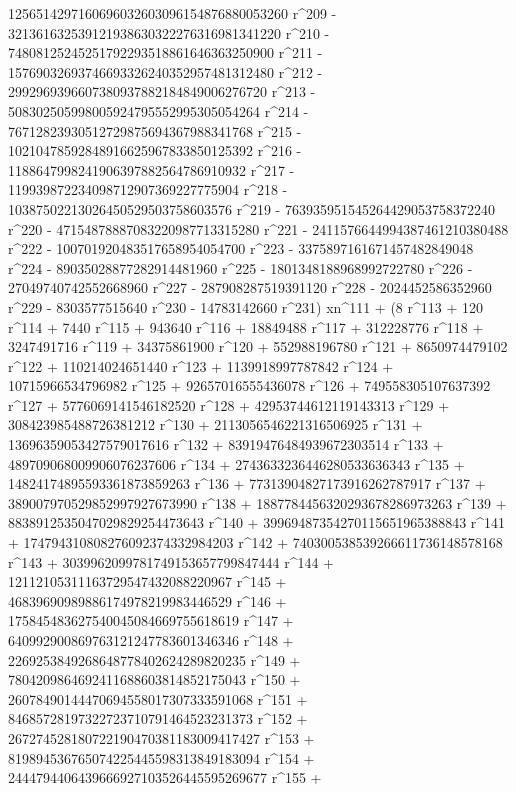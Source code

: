        1256514297160696032603096154876880053260 r^209 - 
       321361632539121938630322276316981341220 r^210 - 
       74808125245251792293518861646363250900 r^211 - 
       15769032693746693326240352957481312480 r^212 - 
       2992969396607380937882184849006276720 r^213 - 
       508302505998005924795552995305054264 r^214 - 
       76712823930512729875694367988341768 r^215 - 
       10210478592848916625967833850125392 r^216 - 
       1188647998241906397882564786910932 r^217 - 
       119939872234098712907369227775904 r^218 - 
       10387502213026450529503758603576 r^219 - 
       763935951545264429053758372240 r^220 - 
       47154878887083220987713315280 r^221 - 
       2411576644994387461210380488 r^222 - 
       100701920483517658954054700 r^223 - 
       3375897161671457482849048 r^224 - 
       89035028877282914481960 r^225 - 1801348188968992722780 r^226 - 
       27049740742552668960 r^227 - 287908287519391120 r^228 - 
       2024452586352960 r^229 - 8303577515640 r^230 - 
       14783142660 r^231) xn^111 + (8 r^113 + 120 r^114 + 
       7440 r^115 + 943640 r^116 + 18849488 r^117 + 312228776 r^118 + 
       3247491716 r^119 + 34375861900 r^120 + 552988196780 r^121 + 
       8650974479102 r^122 + 110214024651440 r^123 + 
       1139918997787842 r^124 + 10715966534796982 r^125 + 
       92657016555436078 r^126 + 749558305107637392 r^127 + 
       5776069141546182520 r^128 + 42953744612119143313 r^129 + 
       308423985488726381212 r^130 + 2113056546221316506925 r^131 + 
       13696359053427579017616 r^132 + 
       83919476484939672303514 r^133 + 
       489709068009906076237606 r^134 + 
       2743633236446280533636343 r^135 + 
       14824174895593361873859263 r^136 + 
       77313904827173916262787917 r^137 + 
       389007970529852997927673990 r^138 + 
       1887784456320293678286973263 r^139 + 
       8838912535047029829254473643 r^140 + 
       39969487354270115651965388843 r^141 + 
       174794310808276092374332984203 r^142 + 
       740300538539266611736148578168 r^143 + 
       3039962099781749153657799847444 r^144 + 
       12112105311163729547432088220967 r^145 + 
       46839690989886174978219983446529 r^146 + 
       175845483627540045084669755618619 r^147 + 
       640992900869763121247783601346346 r^148 + 
       2269253849268648778402624289820235 r^149 + 
       7804209864692411688603814852175043 r^150 + 
       26078490144470694558017307333591068 r^151 + 
       84685728197322723710791464523231373 r^152 + 
       267274528180722190470381183009417427 r^153 + 
       819894536765074225445598313849183094 r^154 + 
       2444794406439666927103526445595269677 r^155 + 
